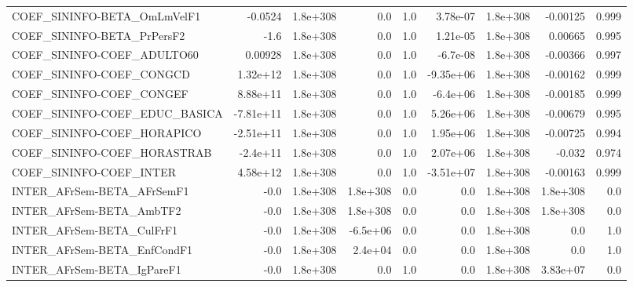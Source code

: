 \begin{tabular}{lrrrrrrrr}
COEF\_SININFO-BETA\_OmLmVelF1           &     -0.0524 &     1.8e+308 &        0.0 &      1.0 &   3.78e-07 &    1.8e+308 &     -0.00125 &         0.999 \\
COEF\_SININFO-BETA\_PrPersF2            &        -1.6 &     1.8e+308 &        0.0 &      1.0 &   1.21e-05 &    1.8e+308 &      0.00665 &         0.995 \\
COEF\_SININFO-COEF\_ADULTO60            &     0.00928 &     1.8e+308 &        0.0 &      1.0 &   -6.7e-08 &    1.8e+308 &     -0.00366 &         0.997 \\
COEF\_SININFO-COEF\_CONGCD              &    1.32e+12 &     1.8e+308 &        0.0 &      1.0 &  -9.35e+06 &    1.8e+308 &     -0.00162 &         0.999 \\
COEF\_SININFO-COEF\_CONGEF              &    8.88e+11 &     1.8e+308 &        0.0 &      1.0 &   -6.4e+06 &    1.8e+308 &     -0.00185 &         0.999 \\
COEF\_SININFO-COEF\_EDUC\_BASICA         &   -7.81e+11 &     1.8e+308 &        0.0 &      1.0 &   5.26e+06 &    1.8e+308 &     -0.00679 &         0.995 \\
COEF\_SININFO-COEF\_HORAPICO            &   -2.51e+11 &     1.8e+308 &        0.0 &      1.0 &   1.95e+06 &    1.8e+308 &     -0.00725 &         0.994 \\
COEF\_SININFO-COEF\_HORASTRAB           &    -2.4e+11 &     1.8e+308 &        0.0 &      1.0 &   2.07e+06 &    1.8e+308 &       -0.032 &         0.974 \\
COEF\_SININFO-COEF\_INTER               &    4.58e+12 &     1.8e+308 &        0.0 &      1.0 &  -3.51e+07 &    1.8e+308 &     -0.00163 &         0.999 \\
INTER\_AFrSem-BETA\_AFrSemF1            &        -0.0 &     1.8e+308 &   1.8e+308 &      0.0 &        0.0 &    1.8e+308 &     1.8e+308 &           0.0 \\
INTER\_AFrSem-BETA\_AmbTF2              &        -0.0 &     1.8e+308 &   1.8e+308 &      0.0 &        0.0 &    1.8e+308 &     1.8e+308 &           0.0 \\
INTER\_AFrSem-BETA\_CulFrF1             &        -0.0 &     1.8e+308 &   -6.5e+06 &      0.0 &        0.0 &    1.8e+308 &          0.0 &           1.0 \\
INTER\_AFrSem-BETA\_EnfCondF1           &        -0.0 &     1.8e+308 &    2.4e+04 &      0.0 &        0.0 &    1.8e+308 &          0.0 &           1.0 \\
INTER\_AFrSem-BETA\_IgPareF1            &        -0.0 &     1.8e+308 &        0.0 &      1.0 &        0.0 &    1.8e+308 &     3.83e+07 &           0.0 \\

\end{tabular}
